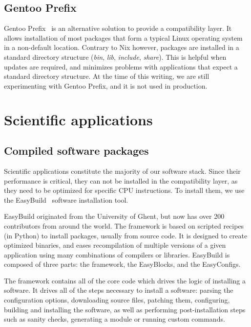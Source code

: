 \documentclass[sigconf]{acmart}
\begin{document}
\subsection{Gentoo Prefix}
\label{sub:Gentoo_Prefix}
Gentoo Prefix~\cite{Gentoo} is an alternative solution to provide a compatibility layer. It allows installation of most packages that form a typical Linux operating system in a non-default location. Contrary to Nix however, packages are installed in a standard directory structure ({\it bin}, {\it lib}, {\it include}, {\it share}). This is helpful when updates are required, and minimizes problems with applications that expect a standard directory structure. At the time of this writing, we are still experimenting with Gentoo Prefix, and it is not used in production. 

\section{Scientific applications}
\label{sec:Scientific_applications}

\subsection{Compiled software packages}
\label{sub:Compiled_software_packages}
Scientific applications constitute the majority of our software stack. Since their performance is critical, they can not be installed in the compatibility layer, as they need to be optimized for specific CPU instructions. To install them, we use the EasyBuild~\cite{EasyBuild2012,EasyBuild2014,EasyBuild2016} software installation tool.

EasyBuild originated from the University of Ghent, but now has over 200 contributors from around the world. The framework is based on scripted recipes (in Python) to install packages, usually from source code. It is designed to create optimized binaries, and eases recompilation of multiple versions of a given application using many combinations of compilers or libraries. EasyBuild is composed of three parts: the framework, the EasyBlocks, and the EasyConfigs. 

The framework contains all of the core code which drives the logic of installing a software. It drives all of the steps necessary to install a software: parsing the configuration options, downloading source files, patching them, configuring, building and installing the software, as well as performing post-installation steps such as sanity checks, generating a module or running custom commands. 
\end{document}
